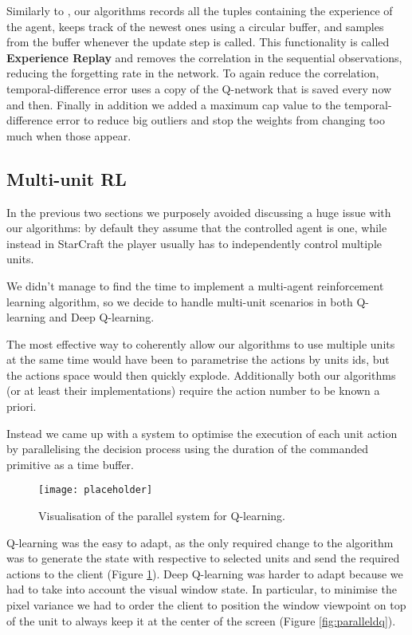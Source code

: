 
Similarly to \cite{mnih_et_al}, our algorithms records all the tuples containing
the experience of the agent, keeps track of the newest ones using a circular
buffer, and samples from the buffer whenever the update step is called. This
functionality is called \textbf{Experience Replay} and removes the correlation
in the sequential observations, reducing the forgetting rate in the network. To
again reduce the correlation, temporal-difference error uses a copy of the
Q-network that is saved every now and then. Finally in addition we added a
maximum cap value to the temporal-difference error to reduce big outliers and
stop the weights from changing too much when those appear.


\subsection{Multi-unit RL}

In the previous two sections we purposely avoided discussing a huge issue with
our algorithms: by default they assume that the controlled agent is one, while
instead in StarCraft the player usually has to independently control multiple
units.

We didn't manage to find the time to implement a multi-agent reinforcement
learning algorithm, so we decide to handle multi-unit scenarios in both
Q-learning and Deep Q-learning. 

The most effective way to coherently allow our algorithms to use multiple units
at the same time would have been to parametrise the actions by units ids, but
the actions space would then quickly explode. Additionally both our algorithms
(or at least their implementations) require the action number to be known
a priori.

Instead we came up with a system to optimise the execution of each unit action
by parallelising the decision process using the duration of the commanded
primitive as a time buffer.

\begin{figure}[h]
    \centering
    \texttt{[image: placeholder]}
    \caption{Visualisation of the parallel system for Q-learning.}
    \label{fig:parallelq}
\end{figure}

Q-learning was the easy to adapt, as the only required change to the algorithm
was to generate the state with respective to selected units and send the
required actions to the client (Figure \ref{fig:parallelq}). Deep Q-learning was
harder to adapt because we had to take into account the visual window state. In
particular, to minimise the pixel variance we had to order the client to
position the window viewpoint on top of the unit to always keep it at the center
of the screen (Figure \ref{fig:paralleldq}).

